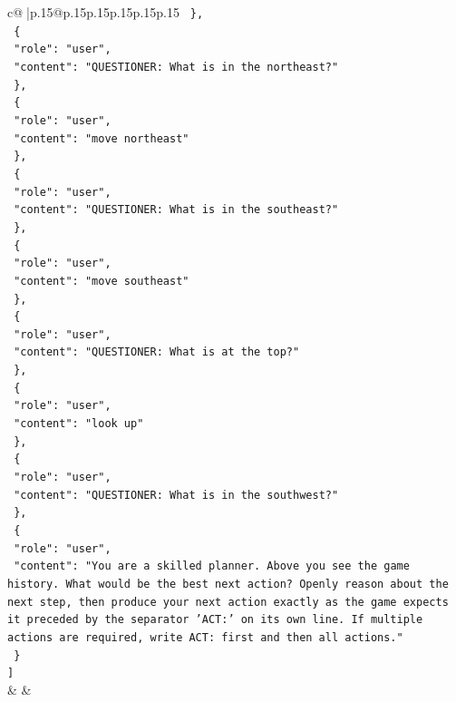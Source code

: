 \documentclass{article}
\begin{document}
{\begin{supertabular}{c@{$\;$}|p{.15\linewidth}@{}p{.15\linewidth}p{.15\linewidth}p{.15\linewidth}p{.15\linewidth}p{.15\linewidth}}
{{{\texttt{  \},} \\
\texttt{  \{} \\
\texttt{    "role": "user",} \\
\texttt{    "content": "QUESTIONER: What is in the northeast?"} \\
\texttt{  \},} \\
\texttt{  \{} \\
\texttt{    "role": "user",} \\
\texttt{    "content": "move northeast"} \\
\texttt{  \},} \\
\texttt{  \{} \\
\texttt{    "role": "user",} \\
\texttt{    "content": "QUESTIONER: What is in the southeast?"} \\
\texttt{  \},} \\
\texttt{  \{} \\
\texttt{    "role": "user",} \\
\texttt{    "content": "move southeast"} \\
\texttt{  \},} \\
\texttt{  \{} \\
\texttt{    "role": "user",} \\
\texttt{    "content": "QUESTIONER: What is at the top?"} \\
\texttt{  \},} \\
\texttt{  \{} \\
\texttt{    "role": "user",} \\
\texttt{    "content": "look up"} \\
\texttt{  \},} \\
\texttt{  \{} \\
\texttt{    "role": "user",} \\
\texttt{    "content": "QUESTIONER: What is in the southwest?"} \\
\texttt{  \},} \\
\texttt{  \{} \\
\texttt{    "role": "user",} \\
\texttt{    "content": "You are a skilled planner. Above you see the game history. What would be the best next action? Openly reason about the next step, then produce your next action exactly as the game expects it preceded by the separator 'ACT:' on its own line. If multiple actions are required, write ACT: first and then all actions."} \\
\texttt{  \}} \\
\texttt{{]}} \\
            }
        }
    }
    & & \\ \\


\end{supertabular}}
\end{document}
